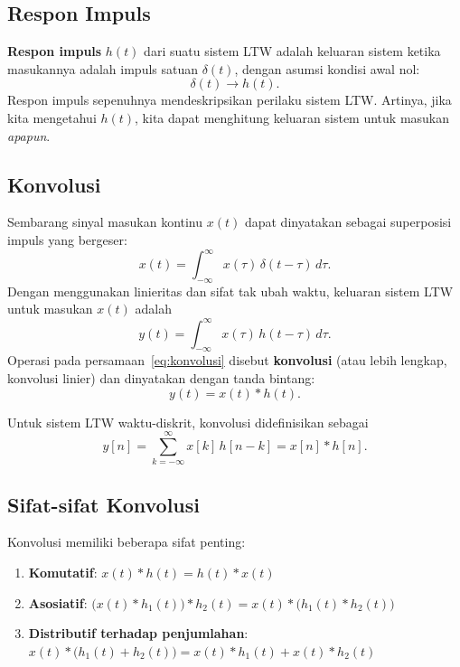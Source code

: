 \subsection{Respon Impuls}

\textbf{Respon impuls} $h(t)$ dari suatu sistem LTW adalah keluaran sistem ketika masukannya adalah impuls satuan $\delta(t)$, dengan asumsi kondisi awal nol:
\begin{equation}
\delta(t) \longrightarrow h(t).
\end{equation}
Respon impuls sepenuhnya mendeskripsikan perilaku sistem LTW. Artinya, jika kita mengetahui $h(t)$, kita dapat menghitung keluaran sistem untuk masukan \textit{apapun}.

\subsection{Konvolusi}

Sembarang sinyal masukan kontinu $x(t)$ dapat dinyatakan sebagai superposisi impuls yang bergeser:
\begin{equation}
x(t) = \int_{-\infty}^{\infty} x(\tau)\,\delta(t-\tau)\,d\tau.
\end{equation}
Dengan menggunakan linieritas dan sifat tak ubah waktu, keluaran sistem LTW untuk masukan $x(t)$ adalah
\begin{equation}
y(t) = \int_{-\infty}^{\infty} x(\tau)\,h(t-\tau)\,d\tau.
\label{eq:konvolusi}
\end{equation}
Operasi pada persamaan~\ref{eq:konvolusi} disebut \textbf{konvolusi} (atau lebih lengkap, konvolusi linier) dan dinyatakan dengan tanda bintang:
\begin{equation}
y(t) = x(t) * h(t).
\end{equation}

Untuk sistem LTW waktu-diskrit, konvolusi didefinisikan sebagai
\begin{equation}
y[n] = \sum_{k=-\infty}^{\infty} x[k]\,h[n-k] = x[n] * h[n].
\end{equation}

\subsection{Sifat-sifat Konvolusi}

Konvolusi memiliki beberapa sifat penting:
\begin{enumerate}
\item \textbf{Komutatif}: $x(t)*h(t) = h(t)*x(t)$
\item \textbf{Asosiatif}: $\bigl(x(t)*h_1(t)\bigr)*h_2(t) = x(t)*\bigl(h_1(t)*h_2(t)\bigr)$
\item \textbf{Distributif terhadap penjumlahan}: $x(t)*\bigl(h_1(t)+h_2(t)\bigr) = x(t)*h_1(t) + x(t)*h_2(t)$
\end{enumerate}

